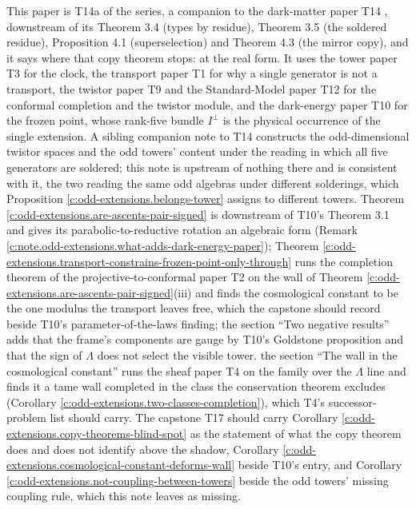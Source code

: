 \documentclass[11pt]{article}
\theoremstyle{definition}
\theoremstyle{plain}
\begin{document}
\label{c:note.odd-extensions.setting-position-series}
This paper is T14a of the series, a companion to the dark-matter paper T14 \cite{ButlerT14}, downstream of its Theorem 3.4 (types by residue), Theorem 3.5 (the soldered residue), Proposition 4.1 (superselection) and Theorem 4.3 (the mirror copy), and it says where that copy theorem stops: at the real form. It uses the tower paper T3 \cite{ButlerT3} for the clock, the transport paper T1 \cite{ButlerT1} for why a single generator is not a transport, the twistor paper T9 \cite{ButlerT9} and the Standard-Model paper T12 \cite{ButlerT12} for the conformal completion and the twistor module, and the dark-energy paper T10 \cite{ButlerT10} for the frozen point, whose rank-five bundle $I^{\perp}$ is the physical occurrence of the single extension. A sibling companion note to T14 constructs the odd-dimensional twistor spaces and the odd towers' content under the reading in which all five generators are soldered; this note is upstream of nothing there and is consistent with it, the two reading the same odd algebras under different solderings, which Proposition \ref{c:odd-extensions.belongs-tower} assigns to different towers. Theorem \ref{c:odd-extensions.are-ascents-pair-signed} is downstream of T10's Theorem 3.1 and gives its parabolic-to-reductive rotation an algebraic form (Remark \ref{c:note.odd-extensions.what-adds-dark-energy-paper}); Theorem \ref{c:odd-extensions.transport-constrains-frozen-point-only-through} runs the completion theorem of the projective-to-conformal paper T2 \cite{ButlerT2} on the wall of Theorem \ref{c:odd-extensions.are-ascents-pair-signed}(iii) and finds the cosmological constant to be the one modulus the transport leaves free, which the capstone should record beside T10's parameter-of-the-laws finding; the section ``Two negative results'' adds that the frame's components are gauge by T10's Goldstone proposition and that the sign of $\Lambda$ does not select the visible tower. the section ``The wall in the cosmological constant'' runs the sheaf paper T4 \cite{ButlerT4} on the family over the $\Lambda$ line and finds it a tame wall completed in the class the conservation theorem excludes (Corollary \ref{c:odd-extensions.two-classes-completion}), which T4's successor-problem list should carry. The capstone T17 \cite{ButlerT17} should carry Corollary \ref{c:odd-extensions.copy-theorems-blind-spot} as the statement of what the copy theorem does and does not identify above the shadow, Corollary \ref{c:odd-extensions.cosmological-constant-deforms-wall} beside T10's entry, and Corollary \ref{c:odd-extensions.not-coupling-between-towers} beside the odd towers' missing coupling rule, which this note leaves as missing.
\end{document}
